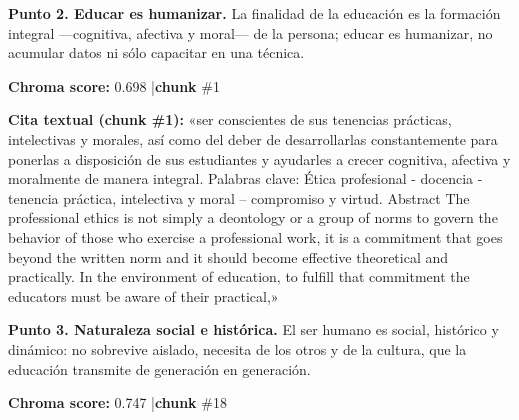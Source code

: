 \documentclass[11pt]{article}
\newcommand{\score}[2]{{\small\textbf{Chroma score:} #1 \quad|\quad \textbf{chunk} \##2}}
\begin{document}
\vspace{0.9em}
\noindent\textbf{Punto 2. Educar es humanizar.} La finalidad de la educaci\'on es la formaci\'on integral ---cognitiva, afectiva y moral--- de la persona; educar es humanizar, no acumular datos ni s\'olo capacitar en una t\'ecnica.\par
\score{0.698}{1}\par\smallskip
{}\par\smallskip
\begin{mdframed}[backgroundcolor=qbg,linecolor=qrule,linewidth=1pt,leftline=true,topline=false,bottomline=false,rightline=false,innerleftmargin=8pt,innertopmargin=6pt,innerbottommargin=6pt]
{\small\textbf{Cita textual (chunk \#1):} «ser conscientes de sus tenencias prácticas, intelectivas y morales, así como del deber de desarrollarlas constantemente para ponerlas a disposición de sus estudiantes y ayudarles a crecer cognitiva, afectiva y moralmente de manera integral. Palabras clave: Ética profesional - docencia - tenencia práctica, intelectiva y moral -- compromiso y virtud. Abstract The professional ethics is not simply a deontology or a group of norms to govern the behavior of those who exercise a professional work, it is a commitment that goes beyond the written norm and it should become effective theoretical and practically. In the environment of education, to fulfill that commitment the educators must be aware of their practical,»}
\end{mdframed}
\par
\vspace{0.9em}
\noindent\textbf{Punto 3. Naturaleza social e hist\'orica.} El ser humano es social, hist\'orico y din\'amico: no sobrevive aislado, necesita de los otros y de la cultura, que la educaci\'on transmite de generaci\'on en generaci\'on.\par
\score{0.747}{18}\par\smallskip
{}\par\smallskip
\end{document}
